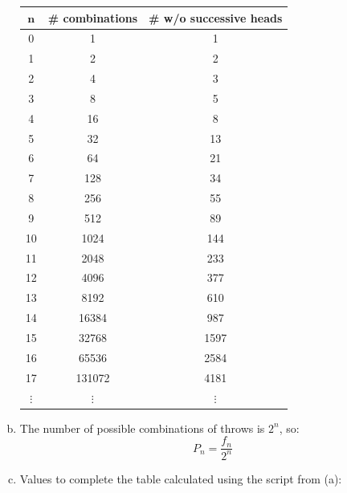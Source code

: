 \documentclass[11pt]{extarticle}
\begin{document}
\begin{enumerate}[(a)]
\begin{table}[H]
\centering
\scriptsize
\begin{tabular}{ccc}
\toprule
$\mathbf{n}$ & \textbf{\# combinations} & \textbf{\# w/o successive heads} \\
\midrule
0&1&1\\
1&2&2\\
2&4&3\\
3&8&5\\
4&16&8\\
5&32&13\\
6&64&21\\
7&128&34\\
8&256&55\\
9&512&89\\
10&1024&144\\
11&2048&233\\
12&4096&377\\
13&8192&610\\
14&16384&987\\
15&32768&1597\\
16&65536&2584\\
17&131072&4181\\
$\vdots$ & $\vdots$ & $\vdots $ \\
\toprule
\end{tabular}
\normalsize
\end{table}

\item The number of possible combinations of throws is $2^n$, so: $$P_n = \frac{f_n}{2^n}$$

\item Values to complete the table calculated using the script from (a):


\end{enumerate}
\end{document}
